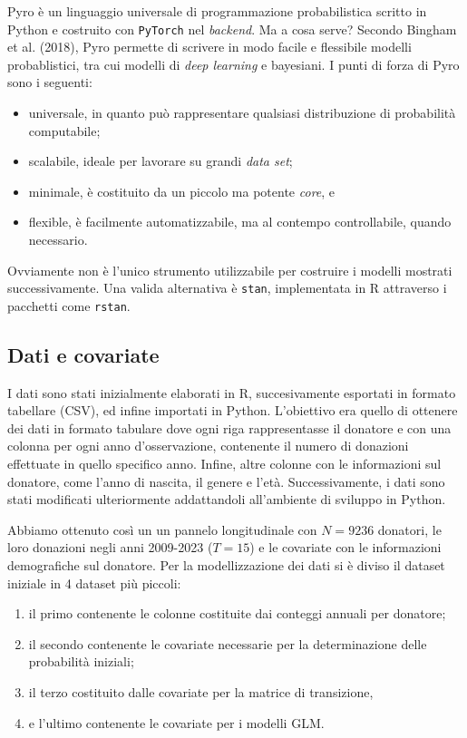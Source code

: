 \documentclass[
  italian,
  a4paper,
  a4paper,
  twoside,
  open=right,
  12pt]{scrbook}
\theoremstyle{definition}
\theoremstyle{remark}
\begin{document}
Pyro è un linguaggio universale di programmazione probabilistica scritto
in Python e costruito con \texttt{PyTorch} nel \emph{backend}. Ma a cosa
serve? Secondo Bingham et al. (2018), Pyro permette di scrivere in modo
facile e flessibile modelli probablistici, tra cui modelli di \emph{deep
learning} e bayesiani. I punti di forza di Pyro sono i seguenti:

\begin{itemize}
\item
  universale, in quanto può rappresentare qualsiasi distribuzione di
  probabilità computabile;
\item
  scalabile, ideale per lavorare su grandi \emph{data set};
\item
  minimale, è costituito da un piccolo ma potente \emph{core}, e
\item
  flexible, è facilmente automatizzabile, ma al contempo controllabile,
  quando necessario.
\end{itemize}

Ovviamente non è l'unico strumento utilizzabile per costruire i modelli
mostrati successivamente. Una valida alternativa è \texttt{stan},
implementata in R attraverso i pacchetti come \texttt{rstan}.

\subsection{Dati e covariate}\label{sec-covariate}

I dati sono stati inizialmente elaborati in R, succesivamente esportati
in formato tabellare (CSV), ed infine importati in Python. L'obiettivo
era quello di ottenere dei dati in formato tabulare dove ogni riga
rappresentasse il donatore e con una colonna per ogni anno
d'osservazione, contenente il numero di donazioni effettuate in quello
specifico anno. Infine, altre colonne con le informazioni sul donatore,
come l'anno di nascita, il genere e l'età. Successivamente, i dati sono
stati modificati ulteriormente addattandoli all'ambiente di sviluppo in
Python.

Abbiamo ottenuto così un un pannelo longitudinale con \(N = 9236\)
donatori, le loro donazioni negli anni 2009-2023 (\(T = 15\)) e le
covariate con le informazioni demografiche sul donatore. Per la
modellizzazione dei dati si è diviso il dataset iniziale in 4 dataset
più piccoli:

\begin{enumerate}
\def\labelenumi{\arabic{enumi}.}
\item
  il primo contenente le colonne costituite dai conteggi annuali per
  donatore;
\item
  il secondo contenente le covariate necessarie per la determinazione
  delle probabilità iniziali;
\item
  il terzo costituito dalle covariate per la matrice di transizione,
\item
  e l'ultimo contenente le covariate per i modelli GLM.
\end{enumerate}
\end{document}
